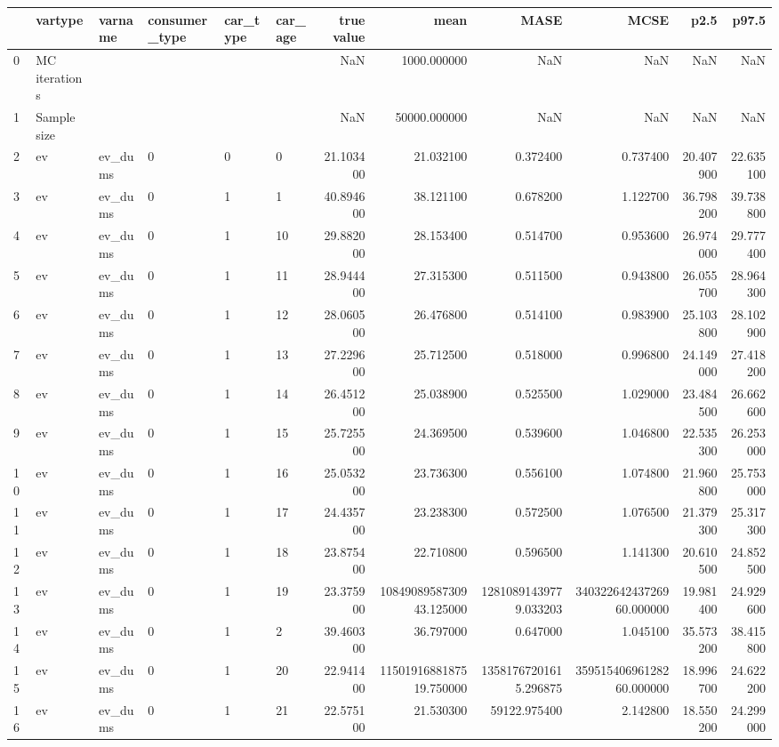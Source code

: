 \begin{tabular}{llllllrrrrrr}
\toprule
 & vartype & varname & consumer_type & car_type & car_age & true value & mean & MASE & MCSE & p2.5 & p97.5 \\
\midrule
0 & MC iterations &  &  &  &  & NaN & 1000.000000 & NaN & NaN & NaN & NaN \\
1 & Sample size &  &  &  &  & NaN & 50000.000000 & NaN & NaN & NaN & NaN \\
2 & ev & ev_dums & 0 & 0 & 0 & 21.103400 & 21.032100 & 0.372400 & 0.737400 & 20.407900 & 22.635100 \\
3 & ev & ev_dums & 0 & 1 & 1 & 40.894600 & 38.121100 & 0.678200 & 1.122700 & 36.798200 & 39.738800 \\
4 & ev & ev_dums & 0 & 1 & 10 & 29.882000 & 28.153400 & 0.514700 & 0.953600 & 26.974000 & 29.777400 \\
5 & ev & ev_dums & 0 & 1 & 11 & 28.944400 & 27.315300 & 0.511500 & 0.943800 & 26.055700 & 28.964300 \\
6 & ev & ev_dums & 0 & 1 & 12 & 28.060500 & 26.476800 & 0.514100 & 0.983900 & 25.103800 & 28.102900 \\
7 & ev & ev_dums & 0 & 1 & 13 & 27.229600 & 25.712500 & 0.518000 & 0.996800 & 24.149000 & 27.418200 \\
8 & ev & ev_dums & 0 & 1 & 14 & 26.451200 & 25.038900 & 0.525500 & 1.029000 & 23.484500 & 26.662600 \\
9 & ev & ev_dums & 0 & 1 & 15 & 25.725500 & 24.369500 & 0.539600 & 1.046800 & 22.535300 & 26.253000 \\
10 & ev & ev_dums & 0 & 1 & 16 & 25.053200 & 23.736300 & 0.556100 & 1.074800 & 21.960800 & 25.753000 \\
11 & ev & ev_dums & 0 & 1 & 17 & 24.435700 & 23.238300 & 0.572500 & 1.076500 & 21.379300 & 25.317300 \\
12 & ev & ev_dums & 0 & 1 & 18 & 23.875400 & 22.710800 & 0.596500 & 1.141300 & 20.610500 & 24.852500 \\
13 & ev & ev_dums & 0 & 1 & 19 & 23.375900 & 1084908958730943.125000 & 12810891439779.033203 & 34032264243726960.000000 & 19.981400 & 24.929600 \\
14 & ev & ev_dums & 0 & 1 & 2 & 39.460300 & 36.797000 & 0.647000 & 1.045100 & 35.573200 & 38.415800 \\
15 & ev & ev_dums & 0 & 1 & 20 & 22.941400 & 1150191688187519.750000 & 13581767201615.296875 & 35951540696128260.000000 & 18.996700 & 24.622200 \\
16 & ev & ev_dums & 0 & 1 & 21 & 22.575100 & 21.530300 & 59122.975400 & 2.142800 & 18.550200 & 24.299000 \\

\end{tabular}
